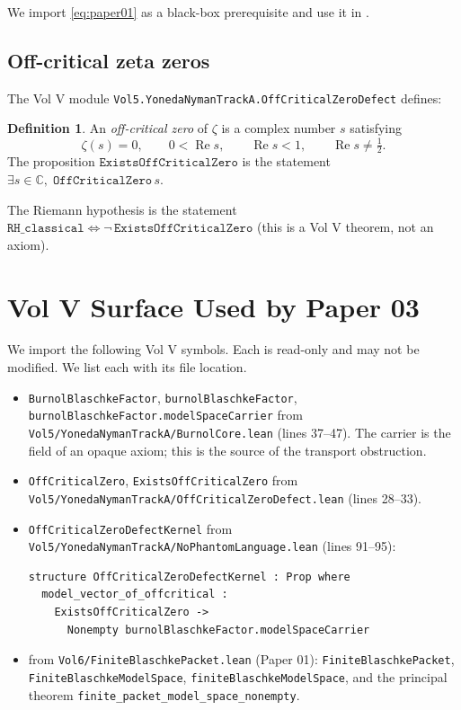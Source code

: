 \documentclass[12pt]{article}
\theoremstyle{definition}
\newtheorem{definition}[theorem]{Definition}
\theoremstyle{remark}
\newcommand{\C}{\mathbb{C}}
\newcommand{\re}{\operatorname{Re}}
\begin{document}
We import \eqref{eq:paper01} as a black-box prerequisite and use it in
.

\subsection{Off-critical zeta zeros}

The Vol V module \texttt{Vol5.YonedaNymanTrackA.OffCriticalZeroDefect}
defines:

\begin{definition}\label{def:off-crit}
An \emph{off-critical zero} of $\zeta$ is a complex number $s$ satisfying
\begin{equation}
\zeta(s) = 0,\qquad 0 < \re s,\qquad \re s < 1,\qquad \re s \neq \tfrac{1}{2}.
\end{equation}
The proposition $\texttt{ExistsOffCriticalZero}$ is the statement
$\exists s\in\C,\;\texttt{OffCriticalZero}\,s$.
\end{definition}

The Riemann hypothesis is the statement
\(
\texttt{RH\_classical} \iff \neg\,\texttt{ExistsOffCriticalZero}
\)
(this is a Vol V theorem, not an axiom).

\section{Vol V Surface Used by Paper 03}\label{sec:lean-skeleton}

We import the following Vol V symbols. Each is read-only and may not be
modified. We list each with its file location.

\begin{itemize}[label=$\bullet$, leftmargin=2em]
\item \texttt{BurnolBlaschkeFactor},
   \texttt{burnolBlaschkeFactor},
   \texttt{burnolBlaschkeFactor.modelSpaceCarrier} from
   \texttt{Vol5/YonedaNymanTrackA/BurnolCore.lean} (lines 37--47). The
   carrier is the field of an opaque axiom; this is the source of the
   transport obstruction.
\item \texttt{OffCriticalZero}, \texttt{ExistsOffCriticalZero} from
\texttt{Vol5/YonedaNymanTrackA/OffCriticalZeroDefect.lean}
(lines 28--33).
\item \texttt{OffCriticalZeroDefectKernel} from
\texttt{Vol5/YonedaNymanTrackA/NoPhantomLanguage.lean} (lines 91--95):
\begin{verbatim}
structure OffCriticalZeroDefectKernel : Prop where
  model_vector_of_offcritical :
    ExistsOffCriticalZero ->
      Nonempty burnolBlaschkeFactor.modelSpaceCarrier
\end{verbatim}
\item from \texttt{Vol6/FiniteBlaschkePacket.lean} (Paper 01):
   \texttt{FiniteBlaschkePacket}, \texttt{FiniteBlaschkeModelSpace},
   \texttt{finiteBlaschkeModelSpace}, and the principal theorem
   \texttt{finite\_packet\_model\_space\_nonempty}.
\end{itemize}
\end{document}
